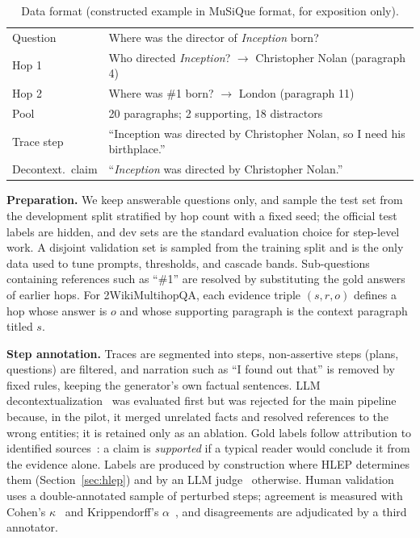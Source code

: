 \documentclass[conference]{IEEEtran}
\begin{document}
\begin{table}[t]
\caption{Data format (constructed example in MuSiQue format, for exposition only).}\label{tab:sample}
\centering\footnotesize
\begin{tabular}{@{}p{}p{}@{}}
\toprule
Question & Where was the director of \emph{Inception} born? \\
Hop 1 & Who directed \emph{Inception}? $\rightarrow$ Christopher Nolan (paragraph 4) \\
Hop 2 & Where was \#1 born? $\rightarrow$ London (paragraph 11) \\
Pool & 20 paragraphs; 2 supporting, 18 distractors \\
\midrule
Trace step & ``Inception was directed by Christopher Nolan, so I need his birthplace.'' \\
Decontext.\ claim & ``\emph{Inception} was directed by Christopher Nolan.'' \\
\bottomrule
\end{tabular}
\end{table}

\textbf{Preparation.} We keep answerable questions only, and sample the test set from the development split stratified by hop count with a fixed seed; the official test labels are hidden, and dev sets are the standard evaluation choice for step-level work. A disjoint validation set is sampled from the training split and is the only data used to tune prompts, thresholds, and cascade bands. Sub-questions containing references such as ``\#1'' are resolved by substituting the gold answers of earlier hops. For 2WikiMultihopQA, each evidence triple $(s,r,o)$ defines a hop whose answer is $o$ and whose supporting paragraph is the context paragraph titled $s$.

\textbf{Step annotation.} Traces are segmented into steps, non-assertive steps (plans, questions) are filtered, and narration such as ``I found out that'' is removed by fixed rules, keeping the generator's own factual sentences. LLM decontextualization~\cite{choi2021decontext} was evaluated first but was rejected for the main pipeline because, in the pilot, it merged unrelated facts and resolved references to the wrong entities; it is retained only as an ablation. Gold labels follow attribution to identified sources~\cite{rashkin2023ais}: a claim is \emph{supported} if a typical reader would conclude it from the evidence alone. Labels are produced by construction where HLEP determines them (Section~\ref{sec:hlep}) and by an LLM judge~\cite{zheng2023judge} otherwise. Human validation uses a double-annotated sample of perturbed steps; agreement is measured with Cohen's $\kappa$~\cite{cohen1960kappa} and Krippendorff's $\alpha$~\cite{krippendorff2004content}, and disagreements are adjudicated by a third annotator.
\end{document}
